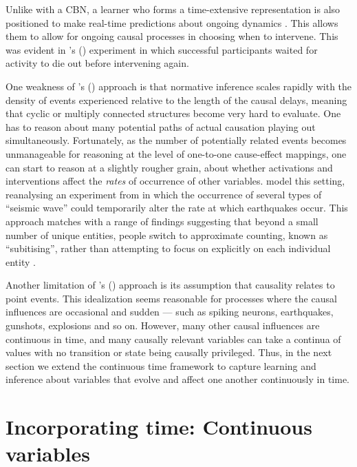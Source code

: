 \documentclass{cambridge7A}%
\def\citeapos#1{\citeauthor{#1}'s (\citeyear{#1})}
\begin{document}
Unlike with a CBN, a learner who forms a time-extensive representation is also positioned to make real-time predictions about ongoing dynamics \citep{clark2013whatever}.  This allows them to allow for ongoing causal processes in choosing when to intervene.   This was evident in \citeapos{bramley2017dynamic} experiment in which successful participants waited for activity to die out before intervening again.

One weakness of \citeapos{bramley2018time} approach is that normative inference scales rapidly with the density of events experienced relative to the length of the causal delays, meaning that cyclic or multiply connected structures become very hard to evaluate.  One has to reason about many potential paths of actual causation playing out simultaneously.  Fortunately, as the number of potentially related events becomes unmanageable for reasoning at the level of one-to-one cause-effect mappings, one can start to reason at a slightly rougher grain, about whether activations and interventions affect the \emph{rates} of occurrence of other variables.  \cite{pacer2015upsetting} model this setting, reanalysing an experiment from \cite{lagnado2010influence} in which the occurrence of several types of ``seismic wave'' could temporarily alter the rate at which earthquakes occur.  This approach matches with a range of findings suggesting that beyond a small number of unique entities, people switch to approximate counting, known as ``subitising'', rather than attempting to focus on explicitly on each individual entity \citep{mandler1982subitizing}.

Another limitation of \citeapos{bramley2018time} approach is its assumption that causality relates to point events.  This idealization seems reasonable for processes where the causal influences are occasional and sudden --- such as spiking neurons, earthquakes, gunshots, explosions and so on.  However, many other causal influences are continuous in time, and many causally relevant variables can take a continua of values with no transition or state being causally privileged.  Thus, in the next section we extend the continuous time framework to capture learning and inference about variables that evolve and affect one another continuously in time.

\section{Incorporating time: Continuous variables}\label{section:ctcv}
\end{document}
